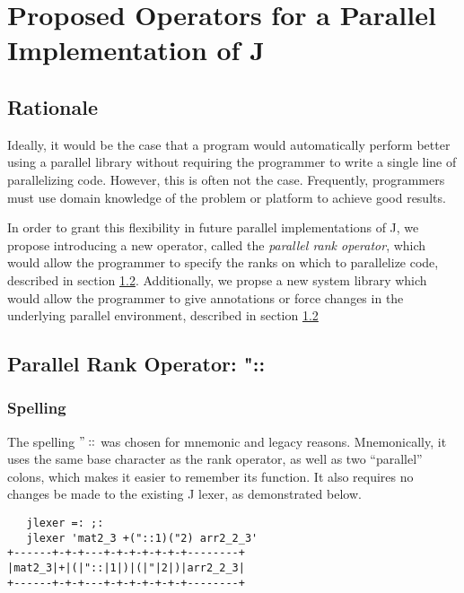 \chapter{Proposed Operators for a Parallel Implementation of J} %
\label{paraop}

\section{Rationale}
Ideally, it would be the case that a program would automatically perform better using a parallel library 
without requiring the programmer to write a single line of parallelizing code. 
However, this is often not the case. %
Frequently, programmers must use domain knowledge of the problem or platform to achieve good results. 

In order to grant this flexibility in future parallel implementations of J, 
we propose introducing a new operator, called the \textit{parallel rank operator}, 
which would allow the programmer to specify the ranks on which to parallelize code, 
described in section \ref{prank}.
Additionally, we propse a new system library
which would allow the programmer to give annotations or force changes in the underlying parallel environment,
described in section \ref{prank}

\section{Parallel Rank Operator: "::}
\label{prank}

\subsection{Spelling}
The spelling $"::$ was chosen for mnemonic and legacy reasons. 
Mnemonically, it uses the same base character as the rank operator, 
as well as two ``parallel'' colons, which makes it easier to remember its function.
It also requires no changes be made to the existing J lexer\cite{ioj}, 
as demonstrated below.

\begin{singlespacing}
\begin{small}
\begin{verbatim}
   jlexer =: ;:
   jlexer 'mat2_3 +("::1)("2) arr2_2_3'
+------+-+-+---+-+-+-+-+-+-+--------+
|mat2_3|+|(|"::|1|)|(|"|2|)|arr2_2_3|
+------+-+-+---+-+-+-+-+-+-+--------+
\end{verbatim}
\end{small}
\end{singlespacing}

